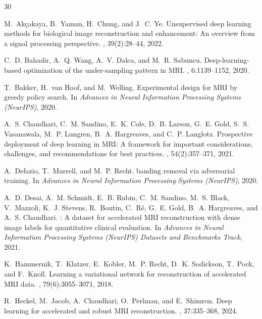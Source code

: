 \documentclass[10pt,twocolumn,letterpaper]{article}
\begin{document}
\begin{thebibliography}{30}

M.~Ak\c{c}akaya, B.~Yaman, H.~Chung, and J.~C. Ye.
\newblock Unsupervised deep learning methods for biological image reconstruction and enhancement: An overview from a signal processing perspective.
, 39(2):28--44, 2022.

C.~D. Bahadir, A.~Q. Wang, A.~V. Dalca, and M.~R. Sabuncu.
\newblock Deep-learning-based optimization of the under-sampling pattern in {MRI}.
, 6:1139--1152, 2020.

T.~Bakker, H.~van Hoof, and M.~Welling.
\newblock Experimental design for {MRI} by greedy policy search.
\newblock In {\em Advances in Neural Information Processing Systems (NeurIPS)}, 2020.

A.~S. Chaudhari, C.~M. Sandino, E.~K. Cole, D.~B. Larson, G.~E. Gold, S.~S. Vasanawala, M.~P. Lungren, B.~A. Hargreaves, and C.~P. Langlotz.
\newblock Prospective deployment of deep learning in {MRI}: A framework for important considerations, challenges, and recommendations for best practices.
, 54(2):357--371, 2021.

A.~Defazio, T.~Murrell, and M.~P. Recht.
 banding removal via adversarial training.
\newblock In {\em Advances in Neural Information Processing Systems (NeurIPS)}, 2020.

A.~D. Desai, A.~M. Schmidt, E.~B. Rubin, C.~M. Sandino, M.~S. Black, V.~Mazzoli, K.~J. Stevens, R.~Boutin, C.~R\'{e}, G.~E. Gold, B.~A. Hargreaves, and A.~S. Chaudhari.
: A dataset for accelerated {MRI} reconstruction with dense image labels for quantitative clinical evaluation.
\newblock In {\em Advances in Neural Information Processing Systems (NeurIPS) Datasets and Benchmarks Track}, 2021.

K.~Hammernik, T.~Klatzer, E.~Kobler, M.~P. Recht, D.~K. Sodickson, T.~Pock, and F.~Knoll.
\newblock Learning a variational network for reconstruction of accelerated {MRI} data.
, 79(6):3055--3071, 2018.

R.~Heckel, M.~Jacob, A.~Chaudhari, O.~Perlman, and E.~Shimron.
\newblock Deep learning for accelerated and robust {MRI} reconstruction.
, 37:335--368, 2024.


\end{thebibliography}
\end{document}
